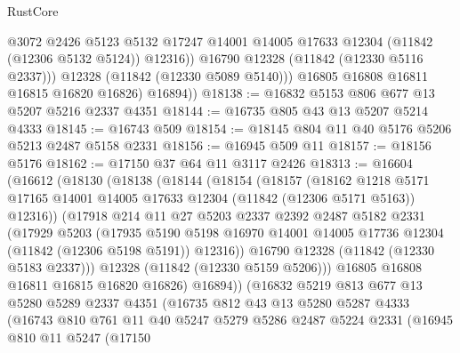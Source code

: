 \begin{lexlean}{RustCore}
\begin{coremodule}
                  @3072
                  @2426
                  @5123
                  @5132
                  @17247
                  @14001
                  @14005
                  @17633
                  @12304
                  (@11842 (@12306 @5132 @5124))
                  @12316))
              @16790
              @12328
              (@11842 (@12330 @5116 @2337)))
            @12328
            (@11842 (@12330 @5089 @5140)))
          @16805
          @16808
          @16811
          @16815
          @16820
          @16826)
        @16894))
@18138 := @16832 @5153 @806 @677 @13 @5207 @5216 @2337 @4351
@18144 := @16735 @805 @43 @13 @5207 @5214 @4333
@18145 := @16743 @509
@18154 := @18145 @804 @11 @40 @5176 @5206 @5213 @2487 @5158 @2331
@18156 := @16945 @509 @11
@18157 := @18156 @5176
@18162 := @17150 @37 @64 @11 @3117 @2426
@18313 := @16604
    (@16612
      (@18130
        (@18138
          (@18144
            (@18154
              (@18157
                (@18162
                  @1218
                  @5171
                  @17165
                  @14001
                  @14005
                  @17633
                  @12304
                  (@11842 (@12306 @5171 @5163))
                  @12316))
              (@17918
                @214
                @11
                @27
                @5203
                @2337
                @2392
                @2487
                @5182
                @2331
                (@17929
                  @5203
                  (@17935
                    @5190
                    @5198
                    @16970
                    @14001
                    @14005
                    @17736
                    @12304
                    (@11842 (@12306 @5198 @5191))
                    @12316))
                @16790
                @12328
                (@11842 (@12330 @5183 @2337)))
              @12328
              (@11842 (@12330 @5159 @5206)))
            @16805
            @16808
            @16811
            @16815
            @16820
            @16826)
          @16894))
      (@16832
        @5219
        @813
        @677
        @13
        @5280
        @5289
        @2337
        @4351
        (@16735
          @812
          @43
          @13
          @5280
          @5287
          @4333
          (@16743
            @810
            @761
            @11
            @40
            @5247
            @5279
            @5286
            @2487
            @5224
            @2331
            (@16945
              @810
              @11
              @5247
              (@17150

\end{coremodule}
\end{lexlean}
